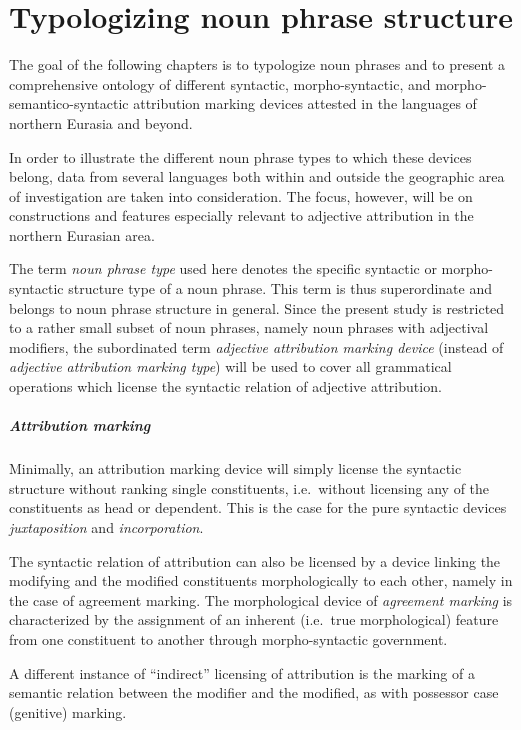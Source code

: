 
\chapter{Typologizing noun phrase structure}

The goal of the following chapters is to typologize noun phrases and to present a comprehensive ontology of different syntactic, morpho-syntactic, and morpho-semantico-syntactic attribution marking devices attested in the languages of northern Eurasia and beyond. 

In order to illustrate the different noun phrase types to which these devices belong, data from several languages both within and outside the geographic area of investigation are taken into consideration. The focus, however, will be on constructions and features especially relevant to adjective attribution in the northern Eurasian area.

The term \emph{noun phrase type} used here denotes the specific syntactic or morpho-syntactic structure type of a noun phrase. This term is thus superordinate and belongs to noun phrase structure in general. Since the present study is restricted to a rather small subset of noun phrases, namely noun phrases with adjectival modifiers, the subordinated term \emph{adjective attribution marking device} (instead of \emph{adjective attribution marking type}) will be used to cover all grammatical operations which license the syntactic relation of adjective attribution.

\paragraph{Attribution marking} Minimally, an attribution marking device will simply license the syntactic structure without ranking single constituents, i.e.~without licensing any of the constituents as head or dependent. This is the case for the pure syntactic devices \emph{juxtaposition} and \emph{incorporation}.

The syntactic relation of attribution can also be licensed by a device linking the modifying and the modified constituents morphologically to each other, namely in the case of agreement marking. The morphological device of \emph{agreement marking} is characterized by the assignment of an inherent (i.e.~true morphological) feature from one constituent to another through morpho-syntactic government.

A different instance of “indirect” licensing of attribution is the marking of a semantic relation between the modifier and the modified, as with possessor case (genitive) marking.

